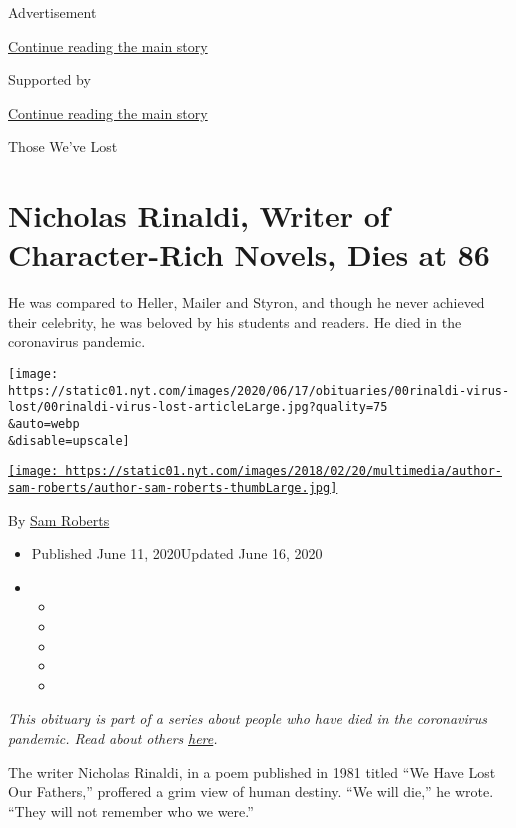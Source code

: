 Advertisement

\protect\hyperlink{after-top}{Continue reading the main story}

Supported by

\protect\hyperlink{after-sponsor}{Continue reading the main story}

Those We've Lost

\hypertarget{nicholas-rinaldi-writer-of-character-rich-novels-dies-at-86}{%
\section{Nicholas Rinaldi, Writer of Character-Rich Novels, Dies at
86}\label{nicholas-rinaldi-writer-of-character-rich-novels-dies-at-86}}

He was compared to Heller, Mailer and Styron, and though he never
achieved their celebrity, he was beloved by his students and readers. He
died in the coronavirus pandemic.

\texttt{[image: https://static01.nyt.com/images/2020/06/17/obituaries/00rinaldi-virus-lost/00rinaldi-virus-lost-articleLarge.jpg?quality=75\\\&auto=webp\\\&disable=upscale]}

\href{https://www.nytimes.com/by/sam-roberts}{\texttt{[image: https://static01.nyt.com/images/2018/02/20/multimedia/author-sam-roberts/author-sam-roberts-thumbLarge.jpg]}}

By \href{https://www.nytimes.com/by/sam-roberts}{Sam Roberts}

\begin{itemize}
\item
  Published June 11, 2020Updated June 16, 2020
\item
  \begin{itemize}
  \item
  \item
  \item
  \item
  \item
  \end{itemize}
\end{itemize}

\emph{This obituary is part of a series about people who have died in
the coronavirus pandemic. Read about others}
\href{https://www.nytimes.com/interactive/2020/obituaries/people-died-coronavirus-obituaries.html}{\emph{here}}\emph{.}

The writer Nicholas Rinaldi, in a poem published in 1981 titled ``We
Have Lost Our Fathers,'' proffered a grim view of human destiny. ``We
will die,'' he wrote. ``They will not remember who we were.''

